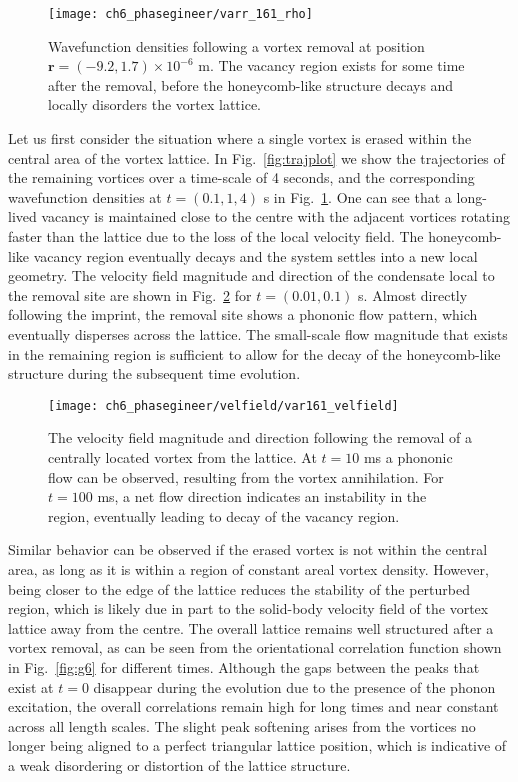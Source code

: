 \begin{figure}\centering
\texttt{[image: ch6\_phasegineer/varr\_161\_rho]}
    \caption{ Wavefunction densities following a vortex removal at position  $\mathbf{r} = (-9.2,1.7)\times 10^{-6}$ m. The vacancy region exists for some time after the removal, before the honeycomb-like structure decays and locally disorders the vortex lattice. }
    \label{fig:varr161_rho}
\end{figure}
Let us first consider the situation where a single vortex is erased within the central area of the vortex lattice. In Fig.~\ref{fig:trajplot} we show the trajectories of the remaining vortices over a time-scale of 4 seconds, and the corresponding wavefunction densities at $t=(0.1,1,4)$ s in Fig.~\ref{fig:varr161_rho}. One can see that a long-lived vacancy is maintained close to the centre with the adjacent vortices rotating faster than the lattice due to the loss of the local velocity field. The honeycomb-like vacancy region eventually decays and the system settles into a new local geometry. The velocity field magnitude and direction of the condensate local to the removal site are shown in Fig.~\ref{fig:varr161_velfield} for $t=(0.01,0.1)$ s. Almost directly following the imprint, the removal site shows a phononic flow pattern, which eventually disperses across the lattice. The small-scale flow magnitude that exists in the remaining region is sufficient to allow for the decay of the honeycomb-like structure during the subsequent time evolution.

\begin{figure}\centering
    \texttt{[image: ch6\_phasegineer/velfield/var161\_velfield]}
    \caption{The velocity field magnitude and direction following the removal of a centrally located vortex from the lattice. At $t=10$ ms a phononic flow can be observed, resulting from the vortex annihilation. For $t=100$ ms, a net flow direction indicates an instability in the region, eventually leading to decay of the vacancy region. }\label{fig:varr161_velfield}
\end{figure}

Similar behavior can be observed if the erased vortex is not within the central area, as long as it is within a region of constant areal vortex density. However, being closer to the edge of the lattice reduces the stability of the perturbed region, which is likely due in part to the solid-body velocity field of the vortex lattice away from the centre. The overall lattice remains well structured after a vortex removal, as can be seen from the orientational correlation function shown in Fig.~\ref{fig:g6} for different times. Although the gaps between the peaks that exist at $t=0$ disappear during the evolution due to the presence of the phonon excitation, the overall correlations remain high for long times and near constant across all length scales. The slight peak softening arises from the vortices no longer being aligned to a perfect triangular lattice position, which is indicative of a weak disordering or distortion of the lattice structure.

